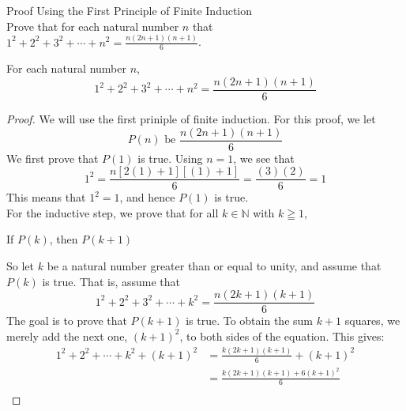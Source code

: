 \newpage
\begin{example}
Proof Using the First Principle of Finite Induction \\

Prove that for each natural number $n$ that $1^2 + 2^2 + 3^2 + \cdots + n^2 = \frac{n(2n+1)(n+1)}{6}$. 
    \begin{tcolorbox}
        \begin{theorem}
            For each natural number $n$,
                \begin{equation*}
                    1^2 + 2^2 + 3^2 + \cdots + n^2 = \frac{n(2n+1)(n+1)}{6} 
                \end{equation*}
        \end{theorem}
    \end{tcolorbox}

    \begin{proof}
        We will use the first priniple of finite induction. For this proof, we let
            \begin{equation*}
                P(n) \text{ be } \frac{n(2n+1)(n+1)}{6}
            \end{equation*}
        We first prove that $P(1)$ is true. Using $n=1$, we see that
            \begin{equation*}
                1^2 = \frac{n[2(1)+1][(1)+1]}{6} = \frac{(3)(2)}{6} = 1
            \end{equation*}
        This means that $1^2=1$, and hence $P(1)$ is true. \\
        For the inductive step, we prove that for all $k \in \mathbb{N}$ with $k \geqq 1$, 
            \begin{center}
                If $P(k)$, then $P(k+1)$
            \end{center}
        So let $k$ be a natural number greater than or equal to unity, and assume that $P(k)$ is true. That is, assume that 
            \begin{equation*}
               1^2 + 2^2 + 3^2 + \cdots + k^2 = \frac{n(2k+1)(k+1)}{6} 
            \end{equation*}
        The goal is to prove that $P(k+1)$ is true. To obtain the sum $k+1$ squares, we merely add the next one, $(k+1)^2$, to both sides of the equation. This gives: 
            \begin{align*}
                1^2 + 2^2 + \cdots + k^2 + (k+1)^2 & = \frac{k(2k+1)(k+1)}{6} + (k+1)^2 \\
                    & = \frac{k(2k+1)(k+1) + 6(k+1)^2}{6} \\

\end{align*}
\end{proof}
\end{example}

